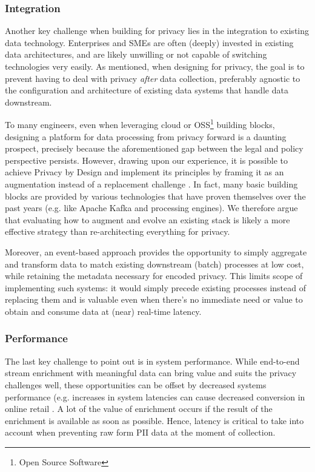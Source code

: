 \documentclass[11pt]{article} %
\begin{document}
\subsubsection{Integration}
Another key challenge when building for privacy lies in the integration to existing data technology. Enterprises and SMEs are often (deeply) invested in existing data architectures, and are likely unwilling or not capable of switching technologies very easily. As mentioned, when designing for privacy, the goal is to prevent having to deal with privacy \emph{after} data collection, preferably agnostic to the configuration and architecture of existing data systems \cite{bhajaria2022data} that handle data downstream.

To many engineers, even when leveraging cloud or OSS\footnote{Open Source Software} building blocks, designing a platform for data processing from privacy forward is a daunting prospect, precisely because the aforementioned gap between the legal and policy perspective persists. However, drawing upon our experience, it is possible to achieve Privacy by Design and implement its principles by framing it as an augmentation instead of a replacement challenge . In fact, many basic building blocks are provided by various technologies that have proven themselves over the past years (e.g. like Apache Kafka and processing engines). We therefore argue that evaluating how to augment and evolve an existing stack is likely a more effective strategy than re-architecting everything for privacy. 

Moreover, an event-based approach provides the opportunity to simply aggregate and transform data to match existing downstream (batch) processes at low cost, while retaining the metadata necessary for encoded privacy. This limits scope of implementing such systems: it would simply precede existing processes instead of replacing them and is valuable even when there's no immediate need or value to obtain and consume data at (near) real-time latency. 

\subsubsection{Performance}
The last key challenge to point out is in system performance. While end-to-end stream enrichment with meaningful data can bring value and suits the privacy challenges well, these opportunities can be offset by decreased systems performance (e.g. increases in system latencies can cause decreased conversion in online retail \cite{akamai}. A lot of the value of enrichment occurs if the result of the enrichment is available as soon as possible. Hence, latency is critical to take into account when preventing raw form PII data at the moment of collection.
\end{document}
